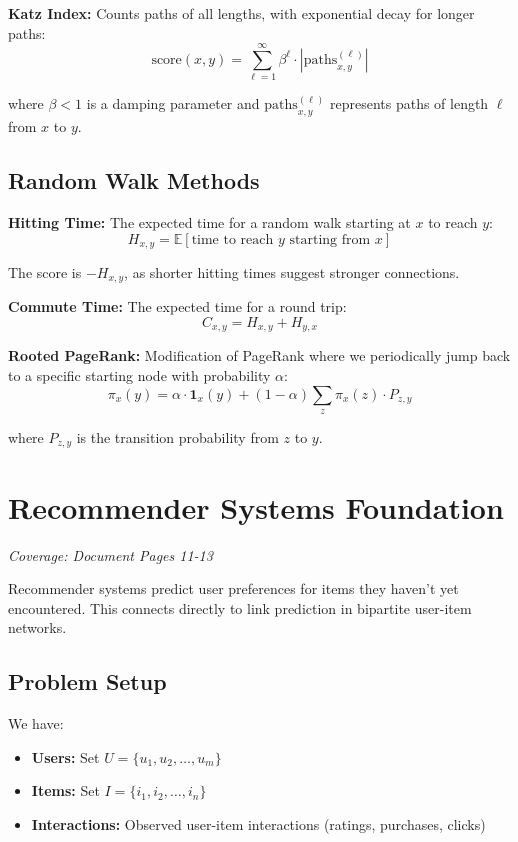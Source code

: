 \documentclass[11pt,a4paper]{article}
\begin{document}
\textbf{Katz Index:} Counts paths of all lengths, with exponential decay for longer paths:
$$\text{score}(x,y) = \sum_{\ell=1}^{\infty} \beta^{\ell} \cdot |\text{paths}^{(\ell)}_{x,y}|$$

where $\beta < 1$ is a damping parameter and $\text{paths}^{(\ell)}_{x,y}$ represents paths of length $\ell$ from $x$ to $y$.

\subsection{Random Walk Methods}

\textbf{Hitting Time:} The expected time for a random walk starting at $x$ to reach $y$:
$$H_{x,y} = \mathbb{E}[\text{time to reach } y \text{ starting from } x]$$

The score is $-H_{x,y}$, as shorter hitting times suggest stronger connections.

\textbf{Commute Time:} The expected time for a round trip:
$$C_{x,y} = H_{x,y} + H_{y,x}$$

\textbf{Rooted PageRank:} Modification of PageRank where we periodically jump back to a specific starting node with probability $\alpha$:
$$\pi_x(y) = \alpha \cdot \mathbf{1}_{x}(y) + (1-\alpha) \sum_{z} \pi_x(z) \cdot P_{z,y}$$

where $P_{z,y}$ is the transition probability from $z$ to $y$.

\section{Recommender Systems Foundation}
\textit{Coverage: Document Pages 11-13}

Recommender systems predict user preferences for items they haven't yet encountered. This connects directly to link prediction in bipartite user-item networks.

\subsection{Problem Setup}
We have:
\begin{itemize}
\item \textbf{Users:} Set $U = \{u_1, u_2, \ldots, u_m\}$
\item \textbf{Items:} Set $I = \{i_1, i_2, \ldots, i_n\}$
\item \textbf{Interactions:} Observed user-item interactions (ratings, purchases, clicks)
\end{itemize}
\end{document}
